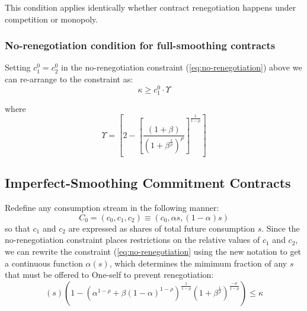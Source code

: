 \documentclass[11pt,english]{article}
\theoremstyle{plain}
\theoremstyle{definition}
\begin{document}
This condition applies identically whether contract renegotiation
happens under competition or monopoly.

\subsubsection{No-renegotiation condition for full-smoothing contracts}

Setting $c_{1}^{0}=c_{2}^{0}$ in the no-renegotiation constraint
(\ref{eq:no-renegotiation}) above we can re-arrange to the constraint as:
\begin{equation}
\kappa\geq c_{1}^{0}\cdotp\Upsilon\label{eq:smoothing-no-renegotiation}
\end{equation}

where
\begin{equation}
\Upsilon=\left[2-\left[\frac{(1+\beta)}{\left(1+\beta^{\frac{1}{\rho}}\right)^{\rho}}\right]^{\frac{1}{1-\rho}}\right]\label{eq:upsilon}
\end{equation}

\subsection{Imperfect-Smoothing Commitment Contracts}

Redefine any consumption stream in the following manner:
\begin{equation}
C_{0}=\left(c_{0},c_{1},c_{2}\right)\equiv\left(c_{0},\alpha s,\left(1-\alpha\right)s\right)\label{eq:new-notation}
\end{equation}
so that $c_{1}$ and $c_{2}$ are expressed as shares of total future
consumption $s$. Since the no-renegotiation constraint places restrictions
on the relative values of $c_{1}$ and $c_{2}$, we can rewrite the
constraint (\ref{eq:no-renegotiation} using the new notation to get
a continuous function $\alpha\left(s\right)$, which determines the
mimimum fraction of any $s$ that must be offered to One-self to prevent
renegotiation:
\begin{equation}
\left(s\right)\left(1-\left(\alpha^{1-\rho}+\beta\left(1-\alpha\right)^{1-\rho}\right)^{\frac{1}{1-\rho}}\left(1+\beta^{\frac{1}{\rho}}\right)^{\frac{-\rho}{1-\rho}}\right)\leq\kappa\label{eq:no-renegotiation-alpha-s}
\end{equation}
\end{document}
